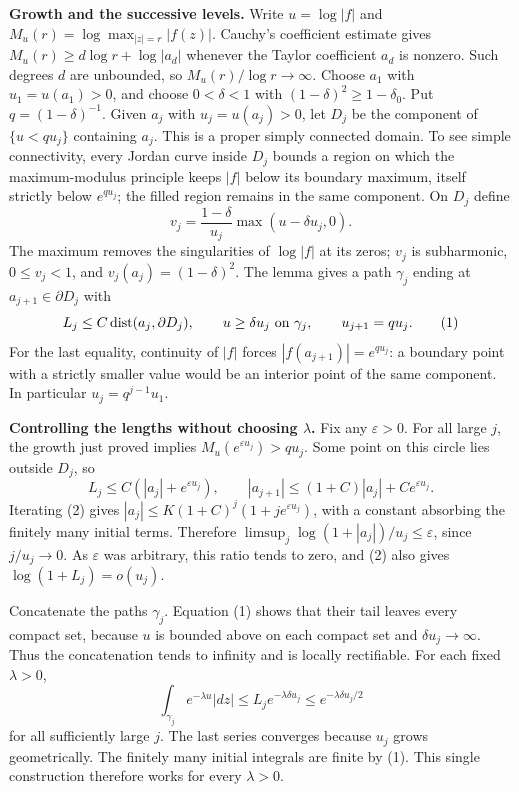 \textbf{Growth and the successive levels.} Write $u=\log|f|$ and $M_u(r)=\log\max_{|z|=r}|f(z)|$. Cauchy's coefficient estimate gives $M_u(r)\geq d\log r+\log|a_d|$ whenever the Taylor coefficient $a_d$ is nonzero. Such degrees $d$ are unbounded, so $M_u(r)/\log r\to\infty$.
Choose $a_1$ with $u_1=u(a_1)>0$, and choose $0<\delta<1$ with $(1-\delta)^2\geq1-\delta_0$. Put $q=(1-\delta)^{-1}$. Given $a_j$ with $u_j=u(a_j)>0$, let $D_j$ be the component of $\{u<q u_j\}$ containing $a_j$. This is a proper simply connected domain. To see simple connectivity, every Jordan curve inside $D_j$ bounds a region on which the maximum-modulus principle keeps $|f|$ below its boundary maximum, itself strictly below $e^{q u_j}$; the filled region remains in the same component.
On $D_j$ define
\[
 v_j=\frac{1-\delta}{u_j}\max(u-\delta u_j,0).
\]
The maximum removes the singularities of $\log|f|$ at its zeros; $v_j$ is subharmonic, $0\leq v_j<1$, and $v_j(a_j)=(1-\delta)^2$. The lemma gives a path $\gamma_j$ ending at $a_{j+1}\in\partial D_j$ with
\[
 L_j\leq C\operatorname{dist}(a_j,\partial D_j),\qquad
 u\geq\delta u_j\ \hbox{on }\gamma_j,\qquad
 u_{j+1}=q u_j.                                      \tag{1}
\]
For the last equality, continuity of $|f|$ forces $|f(a_{j+1})|=e^{q u_j}$: a boundary point with a strictly smaller value would be an interior point of the same component. In particular $u_j=q^{j-1}u_1$.

\textbf{Controlling the lengths without choosing $\lambda$.} Fix any $\varepsilon>0$. For all large $j$, the growth just proved implies $M_u(e^{\varepsilon u_j})>q u_j$. Some point on this circle lies outside $D_j$, so
\[
 L_j\leq C(|a_j|+e^{\varepsilon u_j}),\qquad
 |a_{j+1}|\leq(1+C)|a_j|+Ce^{\varepsilon u_j}.         \tag{2}
\]
Iterating (2) gives $|a_j|\leq K(1+C)^j(1+j e^{\varepsilon u_j})$, with a constant absorbing the finitely many initial terms. Therefore
$\limsup_j\log(1+|a_j|)/u_j\leq\varepsilon$, since $j/u_j\to0$. As $\varepsilon$ was arbitrary, this ratio tends to zero, and (2) also gives $\log(1+L_j)=o(u_j)$.

Concatenate the paths $\gamma_j$. Equation (1) shows that their tail leaves every compact set, because $u$ is bounded above on each compact set and $\delta u_j\to\infty$. Thus the concatenation tends to infinity and is locally rectifiable. For each fixed $\lambda>0$,
\[
 \int_{\gamma_j}e^{-\lambda u}|dz|
 \leq L_j e^{-\lambda\delta u_j}
 \leq e^{-\lambda\delta u_j/2}
\]
for all sufficiently large $j$. The last series converges because $u_j$ grows geometrically. The finitely many initial integrals are finite by (1). This single construction therefore works for every $\lambda>0$.

